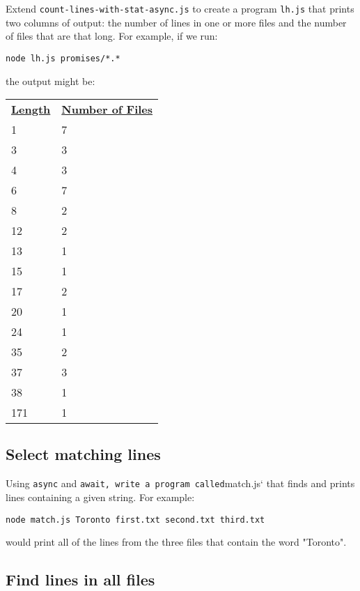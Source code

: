 \documentclass[krantzl]{krantz}
\begin{document}
Extend \texttt{count-lines-with-stat-async.js} to create a program \texttt{lh.js}
that prints two columns of output:
the number of lines in one or more files
and the number of files that are that long.
For example,
if we run:

\begin{lstlisting}[frame=single,frameround=tttt]
node lh.js promises/*.*
\end{lstlisting}


\noindent the output might be:


\vspace{\baselineskip}
\begin{tabular}{ll}
\textbf{\underline{Length}} & \textbf{\underline{Number of Files}} \\
1 & 7 \\
3 & 3 \\
4 & 3 \\
6 & 7 \\
8 & 2 \\
12 & 2 \\
13 & 1 \\
15 & 1 \\
17 & 2 \\
20 & 1 \\
24 & 1 \\
35 & 2 \\
37 & 3 \\
38 & 1 \\
171 & 1 \\
\end{tabular}

\vspace{\baselineskip}

\subsection*{Select matching lines}


Using \texttt{async} and \texttt{await,
write a program called}match.js` that finds and prints lines containing a given string.
For example:

\begin{lstlisting}[frame=single,frameround=tttt]
node match.js Toronto first.txt second.txt third.txt
\end{lstlisting}


\noindent would print all of the lines from the three files that contain the word "Toronto".

\subsection*{Find lines in all files}
\end{document}
